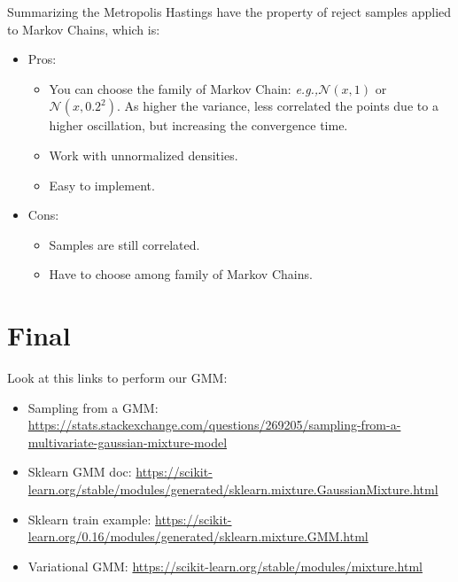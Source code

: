 \documentclass{article}
\newcommand{\eg}{\textit{e.g.,}}
\begin{document}
Summarizing the Metropolis Hastings have the property of reject samples applied to Markov Chains, which is:
\begin{itemize}
    \item Pros: \begin{itemize}
        \item You can choose the family of Markov Chain: \eg $\mathcal{N}(x, 1)$ or $\mathcal{N}(x, 0.2^2)$. As higher the variance, less correlated the points due to a higher oscillation, but increasing the convergence time.
        \item Work with unnormalized densities.
        \item Easy to implement.
    \end{itemize}
    \item Cons: \begin{itemize}
        \item Samples are still correlated.
        \item Have to choose among family of Markov Chains.
    \end{itemize}
\end{itemize}


\section{Final}
Look at this links to perform our GMM:
\begin{itemize}
    \item Sampling from a GMM: \url{https://stats.stackexchange.com/questions/269205/sampling-from-a-multivariate-gaussian-mixture-model}
    \item Sklearn GMM doc: \url{https://scikit-learn.org/stable/modules/generated/sklearn.mixture.GaussianMixture.html}
    \item Sklearn train example: \url{https://scikit-learn.org/0.16/modules/generated/sklearn.mixture.GMM.html}
    \item Variational GMM: \url{https://scikit-learn.org/stable/modules/mixture.html}
\end{itemize}
\end{document}
